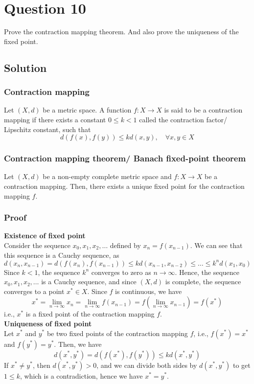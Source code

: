 \section*{Question 10}

Prove the contraction mapping theorem.
And also prove the uniqueness of the fixed point.

\subsection*{Solution}

\subsubsection*{Contraction mapping}

Let \( (X, d) \) be a metric space.
A function \( f: X \to X \) is said to be a contraction mapping if there exists a constant \( 0 \leq k < 1 \) called the contraction factor/ Lipschitz constant, such that
\[
    d(f(x), f(y)) \leq k d(x, y), \quad \forall x, y \in X
\]

\subsubsection*{Contraction mapping theorem/ Banach fixed-point theorem}

Let \( (X, d) \) be a non-empty complete metric space and \( f: X \to X \) be a contraction mapping.
Then, there exists a unique fixed point for the contraction mapping \( f \).

\subsubsection*{Proof}

\textbf{Existence of fixed point}\\
Consider the sequence \( x_0, x_1, x_2, \dots \) defined by \( x_{n} = f(x_{n-1}) \).
We can see that this sequence is a Cauchy sequence, as
\[
    d(x_{n}, x_{n-1}) = d(f(x_{n}), f(x_{n-1})) \leq k d(x_{n-1}, x_{n-2}) \leq \dots \leq k^{n} d(x_1, x_0)
\]
Since \( k < 1 \), the sequence \( k^n \) converges to zero as \( n \to \infty \).
Hence, the sequence \( x_0, x_1, x_2, \dots \) is a Cauchy sequence, and since \( (X, d) \) is complete, the sequence converges to a point \( x^* \in X \).
Since \( f \) is continuous, we have
\[
    x^* = \lim_{n \to \infty} x_n = \lim_{n \to \infty} f(x_{n-1}) = f \left( \lim_{n \to \infty} x_{n-1} \right) = f(x^*)
\]
i.e., \( x^* \) is a fixed point of the contraction mapping \( f \).
\vspace*{1em}\\
\textbf{Uniqueness of fixed point}\\
Let \( x^* \) and \( y^* \) be two fixed points of the contraction mapping \( f \), i.e., \( f(x^*) = x^* \) and \( f(y^*) = y^* \).
Then, we have
\[
    d(x^*, y^*) = d(f(x^*), f(y^*)) \leq k d(x^*, y^*)
\]
If \( x^* \neq y^* \), then \( d(x^*, y^*) > 0 \), and we can divide both sides by \( d(x^*, y^*) \) to get \( 1 \leq k \), which is a contradiction, hence we have \( x^* = y^* \).
